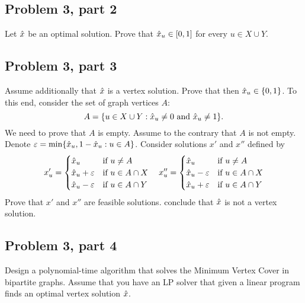 \newpage
\subsection{Problem 3, part 2}
Let $\hat{x}$ be an optimal solution. Prove that $\hat{x}_u \in [0, 1]$ for every $u \in X\cup Y$.

\newpage
\subsection{Problem 3, part 3}
Assume additionally that $\hat{x}$ is a vertex solution. Prove that then $\hat{x}_u \in \{0, 1\}$. To this end, consider the set of graph vertices $A$:
\[A = \{ u \in X \cup Y : \hat{x}_u \neq 0 \text{ and } \hat{x}_u \neq 1\}.\]
We need to prove that $A$ is empty. Assume to the contrary that $A$ is not empty. Denote $\varepsilon = \min \{ \hat{x}_u , 1 - \hat{x}_u : u \in A\}$. Consider solutions $x'$ and $x''$ defined by
\begin{equation*}
    x'_u = \begin{cases}
        \hat{x}_u &\text{if } u \neq A\\
        \hat{x}_u + \varepsilon &\text{if } u \in A\cap X\\
        \hat{x}_u - \varepsilon &\text{if } u \in A\cap Y\\
    \end{cases}\quad
    x''_u = \begin{cases}
        \hat{x}_u &\text{if } u \neq A\\
        \hat{x}_u - \varepsilon &\text{if } u \in A\cap X\\
        \hat{x}_u + \varepsilon &\text{if } u \in A\cap Y\\
    \end{cases}
\end{equation*}
Prove that $x'$ and $x''$ are feasible solutions. conclude that $\hat{x}$ is not a vertex solution. 

\newpage
\subsection{Problem 3, part 4}
Design a polynomial-time algorithm that solves the Minimum Vertex Cover in bipartite graphs. Assume that you have an LP solver that given a linear program finds an optimal vertex solution $\hat{x}$.

